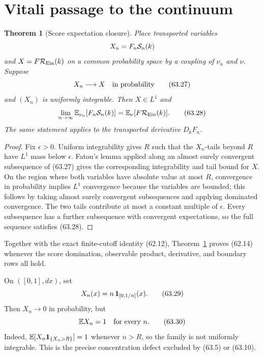 \documentclass[11pt]{article}
\newtheorem{theorem}{Theorem}[section]
\theoremstyle{remark}
\begin{document}
\section{Vitali passage to the continuum}

\begin{theorem}[Score expectation closure]
\label{thm:v15v63-vitali}
Place transported variables
\[
 X_n=F_n{\cal S}_n(k)
\]
and \(X=F{\cal R}_{\rm Ein}(k)\) on a common probability space by
a coupling of \(\nu_n\) and \(\nu\).  Suppose
\[
 X_n\longrightarrow X\quad\hbox{in probability}       \tag{63.27}
\]
and \((X_n)\) is uniformly integrable.  Then \(X\in L^1\) and
\[
 \lim_{n\to\infty}\mathbb E_{\nu_n}
 [F_n{\cal S}_n(k)]
 =
 \mathbb E_{\nu}[F{\cal R}_{\rm Ein}(k)].              \tag{63.28}
\]
The same statement applies to the transported derivative
\(D_kF_n\).
\end{theorem}

\begin{proof}
Fix \(\epsilon>0\).  Uniform integrability gives \(R\) such that
the \(X_n\)-tails beyond \(R\) have \(L^1\) mass below
\(\epsilon\).  Fatou's lemma applied along an almost surely
convergent subsequence of (63.27) gives the corresponding
integrability and tail bound for \(X\).  On the region where both
variables have absolute value at most \(R\), convergence in
probability implies \(L^1\) convergence because the variables are
bounded; this follows by taking almost surely convergent
subsequences and applying dominated convergence.  The two tails
contribute at most a constant multiple of \(\epsilon\).  Every
subsequence has a further subsequence with convergent expectations,
so the full sequence satisfies (63.28).
\end{proof}

Together with the exact finite-cutoff identity (62.12),
Theorem~\ref{thm:v15v63-vitali} proves (62.14) whenever the score
domination, observable product, derivative, and boundary rows all
hold.

\begin{counterexample}
\label{cnt:v15v63-probability}
On \(([0,1],dx)\), set
\[
 X_n(x)=n\,{\bf1}_{[0,1/n]}(x).                       \tag{63.29}
\]
Then \(X_n\to0\) in probability, but
\[
 \mathbb E X_n=1\quad\hbox{for every }n.               \tag{63.30}
\]
Indeed,
\(\mathbb E[X_n{\bf1}_{\{X_n>R\}}]=1\) whenever
\(n>R\), so the family is not uniformly integrable.  This is the
precise concentration defect excluded by (63.5) or (63.10).
\end{counterexample}
\end{document}
